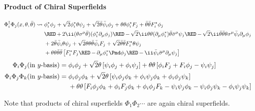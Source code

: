 
\paragraph{Product of Chiral Superfields}
\begin{align}
\Phi^\dagger_i\Phi_j(x,\theta,\btheta)
\leadsto{}
   & \phi^*_i\phi_j
       + \sqrt2\phi^*_i\theta\psi_j + \sqrt2\btheta\bar\psi_i\phi_j
       + \thth \phi^*_iF_j + \bthth F^*_i\phi_j\notag\\
   & {\RED\,+\,} 2\ii(\theta\Sm\btheta)(\phi^*_i\Pm\phi_j)
       {\RED\,-\,} \sqrt2\ii\thth(\Pm\phi^*_i)\btheta\bSm\psi_j
       {\RED\,-\,} \sqrt2\ii\bthth\theta\Sm\bar\psi_i\Pm\phi_j\notag\\
   & + 2\btheta\bar\psi_i\theta\psi_j
       + \sqrt2\thth \btheta\bar\psi_i F_j
       + \sqrt2\bthth F^*_i\theta\psi_j\notag\\
   & + \thth\bthth\left[
        F^*_iF_j {\RED\,-\,} \Pm\phi^*_i\Pmd\phi_j {\RED\,-\,} \ii\bar\psi_i\bSm\Pm\psi_j\right]
\end{align}
\begin{align}
\Phi_i\Phi_j\text{(in $y$-basis)}
={}& \phi_i\phi_j+\sqrt2\theta\left[\psi_i\phi_j+\phi_i\psi_j\right]
     +{\theta\theta}\left[\phi_iF_j+F_i\phi_j-\psi_i\psi_j\right]\\
\Phi_i\Phi_j\Phi_k\text{(in $y$-basis)}
={}& \phi_i\phi_j\phi_k
     + \sqrt2\theta\left[\psi_i\phi_j\phi_k
                        +\phi_i\psi_j\phi_k
                        +\phi_i\phi_j\psi_k\right]\notag\\
   & +{\theta\theta}\left[
      F_i\phi_j\phi_k+\phi_iF_j\phi_k+\phi_i\phi_jF_k
      -\psi_i\psi_j\phi_k-\psi_i\phi_j\psi_k
      -\phi_i\psi_j\psi_k
      \right]
\end{align}

Note that products of chiral superfields $\Phi_1\Phi_2\cdots$ are again
chiral superfields.


